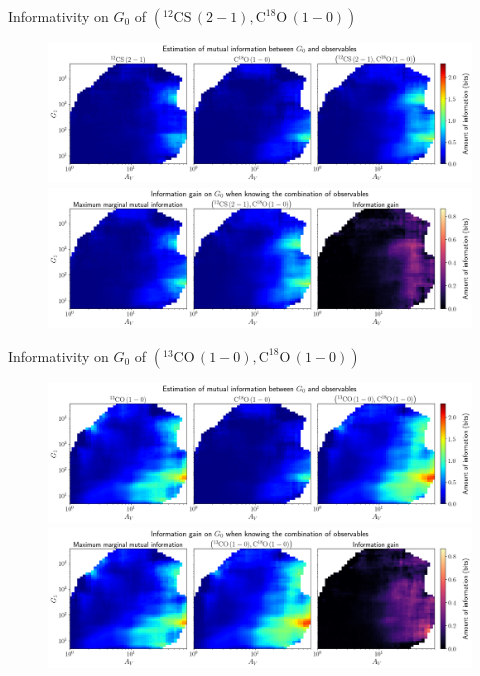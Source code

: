 \documentclass{beamer}
\begin{document}
\begin{frame}{Informativity on $G_0$ of $\left(\mathrm{^{12}CS\,(2-1)},\mathrm{C^{18}O\,(1-0)}\right)$}
    \begin{figure}
        \centering
        \includegraphics[width=0.95\linewidth]{../mi/g0__12cs21_c18o10_mi.png}
        \vfill
        \includegraphics[width=0.95\linewidth]{../mi/g0__12cs21_c18o10_mi_gain.png}
    \end{figure}
\end{frame}

\begin{frame}{Informativity on $G_0$ of $\left(\mathrm{^{13}CO\,(1-0)},\mathrm{C^{18}O\,(1-0)}\right)$}
    \begin{figure}
        \centering
        \includegraphics[width=0.95\linewidth]{../mi/g0__13co10_c18o10_mi.png}
        \vfill
        \includegraphics[width=0.95\linewidth]{../mi/g0__13co10_c18o10_mi_gain.png}
    \end{figure}
\end{frame}
\end{document}
